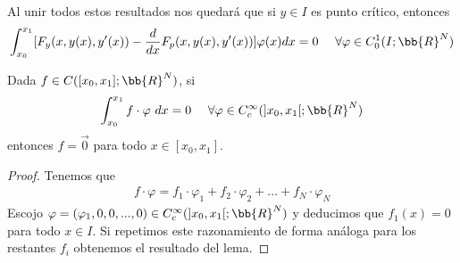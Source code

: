  Al unir todos estos resultados nos quedará que si $y\in I$ es punto crítico, entonces
 \begin{gather*}
    \int_{x_0}^{x_1} [F_y(x, y(x), y'(x)) - \frac{d}{dx}F_p(x, y(x), y'(x))] \varphi(x)dx = 0\ \ \ \ \forall \varphi\in C_0^1(I;\bb{R}^N)
 \end{gather*}

 \begin{lema}
    Dada $f\in C([x_0, x_1]; \bb{R}^N)$, si 
    \begin{gather*}
        \int_{x_0}^{x_1} f \cdot \varphi \ dx = 0 \ \ \ \ \forall \varphi \in C_c^\infty(]x_0, x_1[; \bb{R}^N)
    \end{gather*}
    entonces $f=\vec{0}$ para todo $x\in [x_0, x_1]$.
    \begin{proof}
        Tenemos que 
        \begin{gather*}
            f\cdot \varphi = f_1 \cdot \varphi_1 + f_2 \cdot \varphi_2 + ... + f_N\cdot \varphi_N
        \end{gather*}
        Escojo $\varphi = (\varphi_1, 0, 0, ..., 0) \in C_c^\infty(]x_0, x_1[;\bb{R}^N)$ y deducimos que $f_1(x) = 0$ para todo $x\in I$. Si repetimos este razonamiento de forma análoga para los restantes $f_i$ obtenemos el resultado del lema.
    \end{proof}
 \end{lema}

